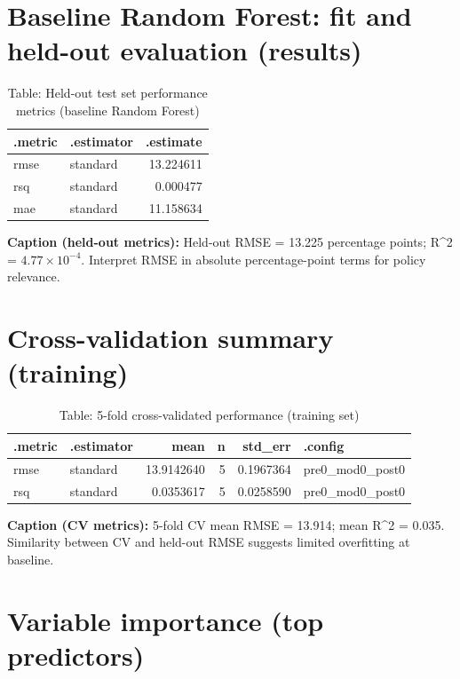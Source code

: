 \documentclass[
  11pt,
]{article}
\begin{document}
\newpage

\section{Baseline Random Forest: fit and held-out evaluation
(results)}\label{baseline-random-forest-fit-and-held-out-evaluation-results}

\begin{longtable}[t]{llr}
\caption{\label{tab:rf-fit-visible}Table: Held-out test set performance metrics (baseline Random Forest)}\\
\toprule
.metric & .estimator & .estimate\\
\midrule
rmse & standard & 13.224611\\
rsq & standard & 0.000477\\
mae & standard & 11.158634\\
\bottomrule
\end{longtable}

\textbf{Caption (held-out metrics):} Held-out RMSE = 13.225 percentage
points; R\^{}2 = \ensuremath{4.77\times 10^{-4}}. Interpret RMSE in
absolute percentage-point terms for policy relevance.

\newpage

\section{Cross-validation summary
(training)}\label{cross-validation-summary-training}

\begin{longtable}[t]{llrrrl}
\caption{\label{tab:cv-visible}Table: 5-fold cross-validated performance (training set)}\\
\toprule
.metric & .estimator & mean & n & std\_err & .config\\
\midrule
rmse & standard & 13.9142640 & 5 & 0.1967364 & pre0\_mod0\_post0\\
rsq & standard & 0.0353617 & 5 & 0.0258590 & pre0\_mod0\_post0\\
\bottomrule
\end{longtable}

\textbf{Caption (CV metrics):} 5-fold CV mean RMSE = 13.914; mean R\^{}2
= 0.035. Similarity between CV and held-out RMSE suggests limited
overfitting at baseline.

\newpage

\section{Variable importance (top
predictors)}\label{variable-importance-top-predictors}
\end{document}
